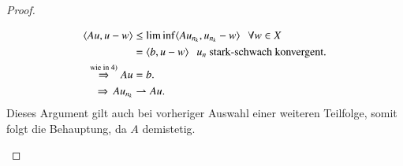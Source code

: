 \begin{proof}
\begin{description}
        \begin{align*}
            \langle Au, u-w \rangle &\leq \liminf \langle Au_{n_k} , u_{n_k} - w\rangle \hspace{.25cm} \forall w \in X\\
            &= \langle b ,  u-w \rangle \hspace{.25cm} \text{$u_n$ stark-schwach konvergent.}\\
            \overset{\text{wie in 4)}}{\Rightarrow}  Au&= b.\\
            \Rightarrow \, Au_{n_k}&\rightharpoonup Au.
        \end{align*}
        Dieses Argument gilt auch bei vorheriger Auswahl einer weiteren Teilfolge, somit folgt die
        Behauptung, da $A$ demistetig.
    \end{description}
    \[ \]
\end{proof}
